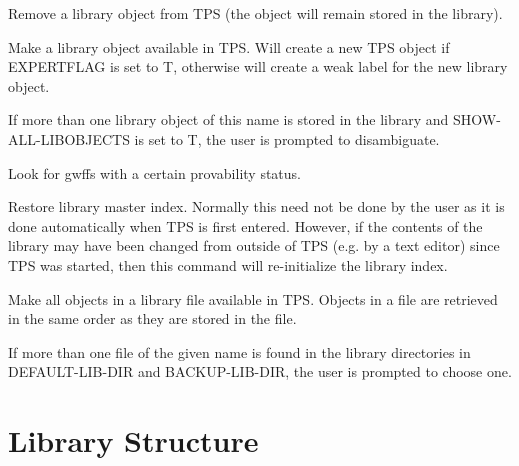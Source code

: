 \begin{description} 
\item[DESTROY]  
Remove a library object from TPS (the object will remain
stored in the library).

\item[FETCH]  
Make a library object available in TPS.
Will create a new TPS object if EXPERTFLAG is set to T, otherwise
will create a weak label for the new library object.

If more than one library object of this name is stored in
the library and SHOW-ALL-LIBOBJECTS is set to T,
the user is prompted to disambiguate.

\item[FIND-PROVABLE]  
Look for gwffs with a certain provability status.

\item[RESTORE-MASTERINDEX]  
Restore library master index. Normally this need not be done by the
user as it is done automatically when TPS is first entered. However, if
the contents of the library may have been changed from outside of TPS
(e.g. by a text editor) since TPS was started, then this command will
re-initialize the library index.

\item[RETRIEVE-FILE]  
Make all objects in a library file available in TPS. Objects in a
file are retrieved in the same order as they are stored in the file.

If more than one file of the given name is found in the library directories
in DEFAULT-LIB-DIR and BACKUP-LIB-DIR, the user is prompted to choose one.
\item
\end{description}

\section{Library Structure}

